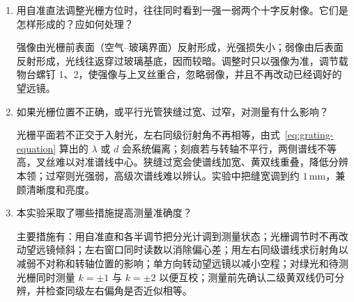 \documentclass{../template/myrpt}
\begin{document}
\begin{enumerate}[label=\arabic*. ]
  \item 用自准直法调整光栅方位时，往往同时看到一强一弱两个十字反射像。它们是怎样形成的？应如何处理？

  强像由光栅前表面（空气--玻璃界面）反射形成，光强损失小；弱像由后表面反射形成，光线往返穿过玻璃基底，因而较暗。调整时只以强像为准，调节载物台螺钉 1、2，使强像与上叉丝重合，忽略弱像，并且不再改动已经调好的望远镜。

  \item 如果光栅位置不正确，或平行光管狭缝过宽、过窄，对测量有什么影响？

  光栅平面若不正交于入射光，左右同级衍射角不再相等，由式~\eqref{eq:grating-equation} 算出的 $\lambda$ 或 $d$ 会系统偏离；刻痕若与转轴不平行，两侧谱线不等高，叉丝难以对准谱线中心。狭缝过宽会使谱线加宽、黄双线重叠，降低分辨本领；过窄则光强弱，高级次谱线难以辨认。实验中把缝宽调到约 $1\,\si{\milli\metre}$，兼顾清晰度和亮度。

  \item 本实验采取了哪些措施提高测量准确度？

  主要措施有：用自准直和各半调节把分光计调到测量状态；光栅调节时不再改动望远镜倾斜；左右窗口同时读数以消除偏心差；用左右同级谱线求衍射角以减弱不对称和转轴位置的影响；单方向转动望远镜以减小空程；对绿光和待测光栅同时测量 $k=\pm1$ 与 $k=\pm2$ 以便互校；测量前先确认二级黄双线仍可分辨，并检查同级左右偏角是否近似相等。
\end{enumerate}
\fi

\insertSignedDataPage
\end{document}
